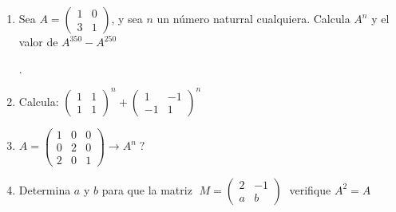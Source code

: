 \begin{enumerate}
\item Sea $A=\left( \begin{matrix} 1&0\\3&1  \end{matrix} \right)$, y sea $n$ un número naturral cualquiera. Calcula $A^n$ y el valor de  $A^{350}-A^{250}$

\normalsize{.}	

\item Calcula: $\left( \begin{matrix} 1&1\\1&1  \end{matrix} \right)^n+\left( \begin{matrix} 1&-1\\-1&1  \end{matrix} \right)^n$



\item $A=\left( \begin{matrix} 1&0&0\\0&2&0\\2&0&1  \end{matrix} \right) \to A^n\; ?$





	
\item Determina $a$ y $b$ para que la matriz $\; M=\left( \begin{matrix}   2&-1\\a&b \end{matrix}\right)\; $ verifique $A^2=A$


\end{enumerate}
